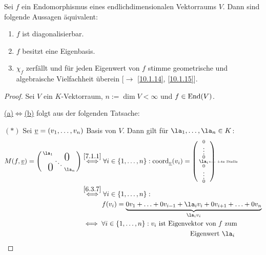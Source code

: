 \documentclass[../../main.tex]{subfiles}
\begin{document}
\begin{sat}\label{10.3.3}
Sei $f$ ein Endomorphismus eines endlichdimensionalen Vektorraums $V$. Dann sind folgende Aussagen äquivalent:
\begin{enumerate}[\rm(a)]
\item $f$ ist diagonalisierbar.
\item $f$ besitzt eine Eigenbasis.
\item $\chi_f$ zerfällt und für jeden Eigenwert von $f$ stimme geometrische und algebraische Vielfachheit überein {\rm[$\to$ \ref{10.1.14}, \ref{10.1.15}]}.
\end{enumerate}
\end{sat}
\begin{proof}
Sei $V$ ein $K$-Vektorraum, $n:=\dim V < \infty$ und $f\in \operatorname{End}(V)$.

\underline{(a)$\iff$(b)} folgt aus der folgenden Tatsache:

$(*)$ Sei ${\underline v} = (v_1,\ldots,v_n)$ Basis von $V$. Dann gilt für $\la_1,\ldots,\la_n\in K$:
\begin{align*}
M(f,\v) = \left(\begin{smallmatrix}
\la_1 & & \llap{$\overset{\blap{\LARGE 0}}{~}$} \\
& \ddots &\\
\rlap{\tlap{\LARGE 0}} & & \la_n
\end{smallmatrix}\right) & \overset{\ref{7.1.1}}{\iff} \forall i\in \left\{1,\ldots,n\right\} : \co_\v(v_i) = \cvec{0\\\vdots\\0\\\la_i\rlap{\tiny $\longleftarrow i$-te Stelle}\\0\\\vdots\\0}\\
& \overset{\ref{6.3.7}}{\iff} \forall i\in \left\{1,\ldots,n\right\}:\\
&\qquad\quad f(v_i) = \underbrace{0v_1+\dotsc +0v_{i-1}+\la_iv_i + 0v_{i+1}+\dotsc +0v_n}_{\la_iv_i} \\
& \iff \forall i\in \left\{1,\ldots,n\right\}: v_i\text{ ist Eigenvektor von $f$ zum}\\
&\qquad\qquad\qquad\qquad\qquad\qquad\qquad\qquad\text{Eigenwert $\la_i$}
\end{align*}


\end{proof}
\end{document}
